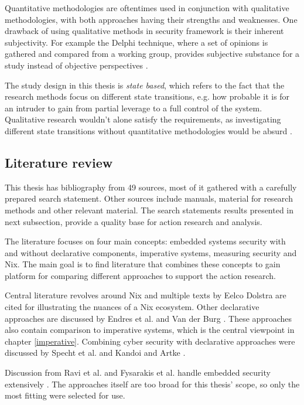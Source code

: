 Quantitative methodologies are oftentimes used in conjunction with
qualitative methodologies, with both approaches having their strengths and
weaknesses. One drawback of using qualitative methods in security
framework is their inherent subjectivity. For example the Delphi
technique, where a set of opinions is gathered and compared from a
working group, provides subjective substance for a study instead of
objective perspectives \cite{wang2005information}.

The study design in this thesis is \textit{state based}, which refers
to the fact that the research methods focus on different state
transitions, e.g. how probable it is  for an intruder to gain from
partial leverage to a full control of the system. Qualitative research
wouldn't alone satisfy the requirements, as investigating different
state transitions without quantitative methodologies would be absurd
\cite{ramos2017model}.

\subsection{Literature review}\label{litrev}

This thesis has bibliography from 49 sources, most of it gathered with
a carefully prepared search statement. Other sources include manuals,
material for research methods and other relevant material. The search
statements results presented in next subsection, provide a quality base
for action research and analysis.

The literature focuses on four main concepts: embedded systems
security with and without declarative components, imperative systems,
measuring security and Nix. The main goal is to find literature that
combines these concepts to gain platform for comparing different
approaches to support the action research.

Central literature revolves around Nix and multiple texts by Eelco
Dolstra are cited for illustrating the nuances of a Nix
ecosystem. Other declarative approaches are discussed by Endres
et al. and Van der Burg \cite{van2010declarative, endres2017declarative}. These approaches also contain comparison to
imperative systems, which is the central viewpoint in chapter
\ref{imperative}. Combining cyber security with declarative approaches
were discussed by Specht et al. and Kandoi and Artke
\cite{specht2007analysis, kandoi2021operating}.

Discussion from Ravi et al. and Fysarakis et al. handle embedded security
extensively \cite{ravi2004security, fysarakis2014embedded}. The
approaches itself  are too broad for this thesis' scope, so
only the most fitting were selected for use.

